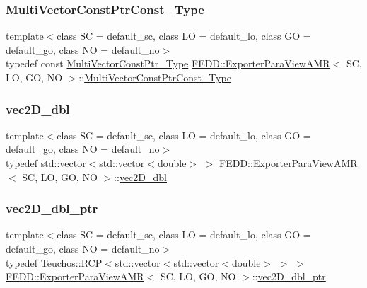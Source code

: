 \subsubsection{\texorpdfstring{Multi\+Vector\+Const\+Ptr\+Const\+\_\+\+Type}{MultiVectorConstPtrConst\_Type}}
{\footnotesize\ttfamily template$<$class SC  = default\+\_\+sc, class LO  = default\+\_\+lo, class GO  = default\+\_\+go, class NO  = default\+\_\+no$>$ \\
typedef const \hyperlink{classFEDD_1_1ExporterParaViewAMR_a6be568ff4943f421566c689db311cdd3}{Multi\+Vector\+Const\+Ptr\+\_\+\+Type} \hyperlink{classFEDD_1_1ExporterParaViewAMR}{F\+E\+D\+D\+::\+Exporter\+Para\+View\+A\+MR}$<$ SC, LO, GO, NO $>$\+::\hyperlink{classFEDD_1_1ExporterParaViewAMR_a8cde0bbf33cda8c311ffebf847823717}{Multi\+Vector\+Const\+Ptr\+Const\+\_\+\+Type}}

\mbox{\label{classFEDD_1_1ExporterParaViewAMR_a0f12f69d4a09396adfd3204eaff68547}} 
\subsubsection{\texorpdfstring{vec2\+D\+\_\+dbl}{vec2D\_dbl}}
{\footnotesize\ttfamily template$<$class SC  = default\+\_\+sc, class LO  = default\+\_\+lo, class GO  = default\+\_\+go, class NO  = default\+\_\+no$>$ \\
typedef std\+::vector$<$std\+::vector$<$double$>$ $>$ \hyperlink{classFEDD_1_1ExporterParaViewAMR}{F\+E\+D\+D\+::\+Exporter\+Para\+View\+A\+MR}$<$ SC, LO, GO, NO $>$\+::\hyperlink{classFEDD_1_1ExporterParaViewAMR_a0f12f69d4a09396adfd3204eaff68547}{vec2\+D\+\_\+dbl}}

\mbox{\label{classFEDD_1_1ExporterParaViewAMR_a01fe5fb6093914c1a246219c8c8db248}} 
\subsubsection{\texorpdfstring{vec2\+D\+\_\+dbl\+\_\+ptr}{vec2D\_dbl\_ptr}}
{\footnotesize\ttfamily template$<$class SC  = default\+\_\+sc, class LO  = default\+\_\+lo, class GO  = default\+\_\+go, class NO  = default\+\_\+no$>$ \\
typedef Teuchos\+::\+R\+CP$<$std\+::vector$<$std\+::vector$<$double$>$ $>$ $>$ \hyperlink{classFEDD_1_1ExporterParaViewAMR}{F\+E\+D\+D\+::\+Exporter\+Para\+View\+A\+MR}$<$ SC, LO, GO, NO $>$\+::\hyperlink{classFEDD_1_1ExporterParaViewAMR_a01fe5fb6093914c1a246219c8c8db248}{vec2\+D\+\_\+dbl\+\_\+ptr}}

